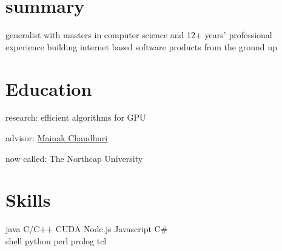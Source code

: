 
\begin{minipage}[t]{0.32\textwidth} %

\section{summary}
\location{}
generalist with masters in computer science and 12+ years' professional experience building internet based software products from the ground up
\sectionspace %

\section{Education} 
\vspace{\topsep} %
\vspace{1pt}
\begin{tightitemize}
\item research: efficient algorithms for GPU \href{https://www.scienceopen.com/hosted-document?doi=10.14293/S2199-1006.1.SOR-.PPLHU62.v1}{\faChain}
\item advisor: \href{https://www.cse.iitk.ac.in/users/mainakc/}{Mainak Chaudhuri} 
\end{tightitemize}
\vspace{6pt}

\begin{tightitemize}
\item now called: The Northcap University
\end{tightitemize}



\sectionspace %

\section{Skills}

java \textbullet{} C/C++ \textbullet{} CUDA \textbullet{} Node.js \textbullet{} Javascript \textbullet{} C\#\\ 
shell \textbullet{} python \textbullet{} perl \textbullet{} prolog \textbullet{} tcl\\
\sectionspace %


\end{minipage}
